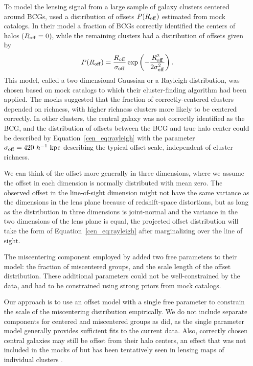 To model the lensing signal from a large sample of galaxy clusters
centered around BCGs, \citet{Johnston2007b} used a distribution of
offsets $P(R_{\rm off})$ estimated from mock catalogs. In their model
a fraction of BCGs correctly identified the centers of halos
($R_{\rm off}=0$), while the remaining clusters had a distribution of
offsets given by
\begin{equation}
P(R_{\rm off})=\frac{R_{\rm off}}{\sigma_{\rm off}}
\exp\left(-\frac{R_{\rm off}^2}{2 \sigma_{\rm off}^2}\right).
\label{cen_eq:rayleigh}
\end{equation}
This model, called a two-dimensional Gaussian or a Rayleigh
distribution, was chosen based on mock catalogs to which their
cluster-finding algorithm had been applied. The mocks suggested
that the fraction of correctly-centered clusters depended on
richness, with higher richness clusters more likely to be centered
correctly. In other clusters, the central galaxy was not correctly
identified as the BCG, and the distribution of offsets between the BCG
and true halo center could be described by
Equation~\eqref{cen_eq:rayleigh} with the parameter $\sigma_{\rm
  off}=420~h^{-1}~\rm{kpc}$ describing the typical offset scale,
independent of cluster richness.

We can think of the offset more generally in three dimensions, where
we assume the offset in each dimension is normally distributed with
mean zero. The observed offset in the line-of-sight dimension might
not have the same variance as the dimensions in the lens plane because
of redshift-space distortions, but as long as the distribution in
three dimensions is joint-normal and the variance in the two
dimensions of the lens plane is equal, the projected offset distribution
will take the form of Equation~\eqref{cen_eq:rayleigh} after marginalizing
over the line of sight.

The miscentering component employed by \citet{Johnston2007b} added
two free parameters to their model: the fraction of miscentered
groups, and the scale length of the offset distribution. These
additional parameters could not be well-constrained by the data, and
had to be constrained using strong priors from mock catalogs.

Our approach is to use an offset model with a single free parameter to
constrain the scale of the miscentering distribution empirically.  We
do not include separate components for centered and miscentered groups
as \citet{Johnston2007b} did, as the single parameter model generally
provides sufficient fits to the current data. Also, correctly chosen central
galaxies may still be offset from their halo centers, an effect that
was not included in the mocks of \citet{Johnston2007b} but has been
tentatively seen in lensing maps of individual clusters
\citep{Oguri2010}. 

